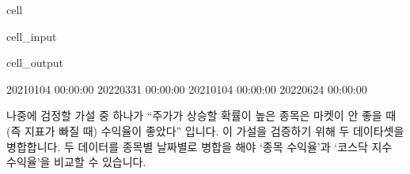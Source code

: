 \documentclass[letterpaper,10pt,english]{jupyterBook}
\begin{document}
\begin{sphinxuseclass}{cell}\begin{sphinxVerbatimInput}

\begin{sphinxuseclass}{cell_input}
\begin{sphinxVerbatim}[commandchars=\\\{\}]
   
   
   

 
 
\end{sphinxVerbatim}

\end{sphinxuseclass}\end{sphinxVerbatimInput}
\begin{sphinxVerbatimOutput}

\begin{sphinxuseclass}{cell_output}
\begin{sphinxVerbatim}[commandchars=\\\{\}]
2021\PYGZhy{}01\PYGZhy{}04 00:00:00 2022\PYGZhy{}03\PYGZhy{}31 00:00:00
2021\PYGZhy{}01\PYGZhy{}04 00:00:00 2022\PYGZhy{}06\PYGZhy{}24 00:00:00
\end{sphinxVerbatim}

\end{sphinxuseclass}\end{sphinxVerbatimOutput}

\end{sphinxuseclass}
\sphinxAtStartPar
 나중에 검정할 가설 중 하나가 “주가가 상승할 확률이 높은 종목은 마켓이 안 좋을 때(즉 지표가 빠질 때) 수익율이 좋았다” 입니다. 이 가설을 검증하기 위해 두 데이타셋을 병합합니다. 두 데이터를 종목별 날짜별로 병합을 해야 ‘종목 수익율’과 ‘코스닥 지수 수익율’을 비교할 수 있습니다.
\end{document}
